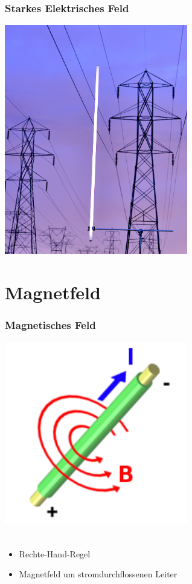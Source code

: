 \begin{frame}
  \frametitle{Starkes Elektrisches Feld}
  \begin{center}
    \includegraphics[width=0.6\textwidth,height=.85\textheight,keepaspectratio]{a08/Fluorescent_tube_under_electric_line.jpg}
    {\tiny \hyperlink{refs}{\cite{wm}}}
  \end{center}
\end{frame}

\section*{Magnetfeld}

\begin{frame}
  \frametitle{Magnetisches Feld}
  \begin{center}
    \includegraphics[width=0.6\textwidth,height=.6\textheight,keepaspectratio]{a08/RechteHand.png}\\
    {\tiny \hyperlink{refs}{\cite{wm}}} \\[1em]
    \begin{itemize}
      \item Rechte-Hand-Regel
      \item Magnetfeld um stromdurchflossenen Leiter
    \end{itemize}
  \end{center}
\end{frame}

